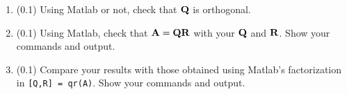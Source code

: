 \begin{enumerate}
\begin{enumerate}
\item (0.1) Using Matlab or not, check that $\mbox{${\bf Q}$}$ is orthogonal.

\item (0.1) Using Matlab, check that $\mbox{${\bf A}$} = \mbox{${\bf Q}$}\mbox{${\bf R}$}$ with your $\mbox{${\bf Q}$}$ and $\mbox{${\bf R}$}$. Show your commands and output.

\item (0.1) Compare your results with those obtained using Matlab's factorization in \verb+[Q,R] = qr(A)+. Show your commands and output.
\end{enumerate}

\end{enumerate}
